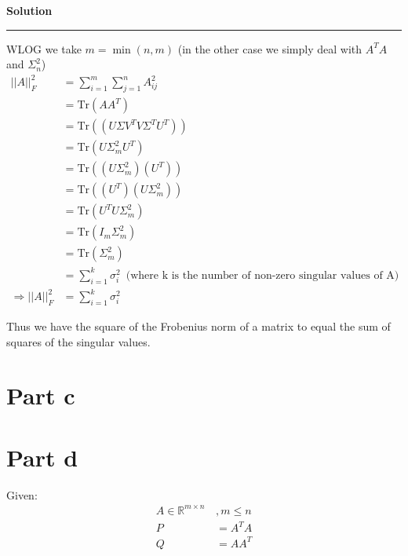 \documentclass[a4paper,12pt]{article}
\newenvironment{solution}[2][]{%
    \begin{mdframed}[linecolor=blue!70!black, linewidth=2pt, roundcorner=10pt, backgroundcolor=yellow!10!white, skipabove=12pt, skipbelow=12pt]%
        \textbf{\large #2}
        \par\noindent\rule{\textwidth}{0.4pt}
}{
    \end{mdframed}
}
\begin{document}
\begin{solution}{Solution}
      WLOG we take $m = \min(n,m)$ (in the other case we simply deal with $A^{T}A$ and $\Sigma_{n}^{2}$)
      \begin{align*}
          \lvert\lvert A \rvert\rvert_{F}^{2} &= \sum\limits_{i = 1}^{m}\sum\limits_{j = 1}^{n} A_{ij}^{2} \\
                                              &= \text{Tr}(AA^{T}) \\
                                              &= \text{Tr}((U\Sigma V^{T} V \Sigma^{T} U^{T})) \\
                                              &= \text{Tr} (U \Sigma_{m}^{2} U^{T}) \\
                                              &= \text{Tr} ((U \Sigma_{m}^{2}) (U^{T})) \\
                                              &= \text{Tr} ((U^{T})(U \Sigma_{m}^{2})) \\
                                              &= \text{Tr} (U^{T} U \Sigma_{m}^{2}) \\
                                              &= \text{Tr} (I_{m} \Sigma_{m}^{2}) \\
                                              &= \text{Tr} (\Sigma_{m}^{2}) \\
                                              &= \sum\limits_{i = 1}^{k} \sigma_{i}^{2} \,\text{ (where k is the number of non-zero singular values of A)} \\
          \Rightarrow \lvert\lvert A \rvert \rvert_{F}^{2} &= \sum\limits_{i = 1}^{k} \sigma_{i}^{2} 
      \end{align*}

      Thus we have the square of the Frobenius norm of a matrix to equal the sum of squares of the singular values.

      \section*{Part c}

      \section*{Part d}

      Given:
      \begin{align*}
        A \in \mathbb{R}^{m \times n} \, &, m \leqslant n \\
        P &= A^{T}A \\
        Q &= AA^{T}
      \end{align*}


\end{solution}
\end{document}
